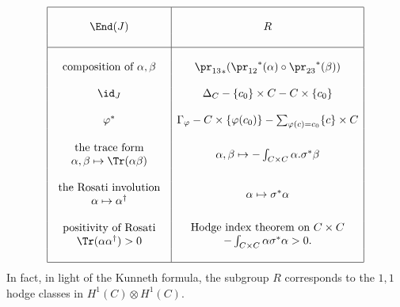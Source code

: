 $$
\begin{array}{|c|c|}
\hline 
& \\
\End(J)  & R 
\\ & \\
\hline
& \\
\text{composition of $\alpha, \beta$} 
& 
{\pr_{13}}_* ({\pr_{12}}^*(\alpha) \circ {\pr_{23}}^*(\beta)) 
\\ & \\
\id_J 
& 
\Delta_C - \{c_0\} \times C - C \times \{c_0\}
\\ & \\
\varphi^* 
& 
\Gamma_\varphi - C \times \{\varphi(c_0)\} - \sum_{\varphi(c) = c_0} \{c\} \times C 
\\ & \\
{\begin{array}{c}
\text{the trace form} \\
\alpha, \beta \mapsto \Tr(\alpha \beta)
\end{array}}
& 
\alpha, \beta \mapsto - \int_{C\times C} \alpha . \sigma^*\beta
\\ & \\
{\begin{array}{c}
\text{the Rosati involution} \\
\alpha \mapsto \alpha^\dagger
\end{array}}
&  
\alpha \mapsto \sigma^*\alpha
\\ & \\
{\begin{array}{c}
\text{positivity of Rosati} \\
\Tr(\alpha\alpha^\dagger) > 0
\end{array}}
&  
{\begin{array}{c}
\text{Hodge index theorem on $C\times C$} \\
- \int_{C\times C} \alpha \sigma^*\alpha > 0.
\end{array}}
\\ & \\
\hline
\end{array}
$$
In fact, in light of the Kunneth formula, the subgroup $R$ corresponds to the $1,1$ hodge classes in $H^1(C)\otimes H^1(C)$.

